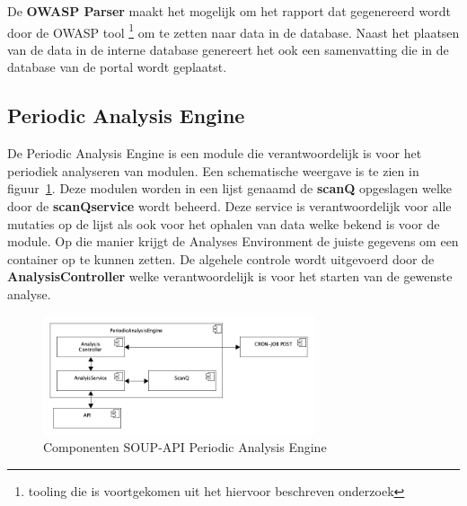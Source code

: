De \textbf{OWASP Parser} maakt het mogelijk om het rapport dat gegenereerd wordt door de OWASP tool \footnote{tooling die is voortgekomen uit het hiervoor beschreven onderzoek} om te zetten naar data in de database. Naast het plaatsen van de data in de interne database genereert het ook een samenvatting die in de database van de portal wordt geplaatst.

\subsection{Periodic Analysis Engine}\label{subsec:periodicanalysisengine}
De Periodic Analysis Engine is een module die verantwoordelijk is voor het periodiek analyseren van modulen. Een schematische weergave is te zien in figuur~\ref{fig:SOUPAPIPeriodicAnalysisEngineComps}. Deze modulen worden in een lijst genaamd de \textbf{scanQ} opgeslagen welke door de \textbf{scanQservice} wordt beheerd. Deze service is verantwoordelijk voor alle mutaties op de lijst als ook voor het ophalen van data welke bekend is voor de module. Op die manier krijgt de Analyses Environment de juiste gegevens om een container op te kunnen zetten. De algehele controle wordt uitgevoerd door de \textbf{AnalysisController} welke verantwoordelijk is voor het starten van de gewenste analyse.

\begin{figure}[bth]
    \myfloatalign
    \includegraphics[width=8cm]{gfx/umlet/exports/PeriodicAnalyisEngineComponents}
    \caption{Componenten SOUP-API Periodic Analysis Engine}
    \label{fig:SOUPAPIPeriodicAnalysisEngineComps}
\end{figure}

\newpage %

